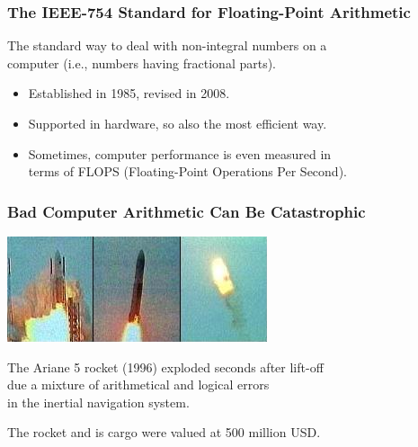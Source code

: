 \begin{frame}

\frametitle{The IEEE-754 Standard for Floating-Point Arithmetic}

\vspace{\fill}

\begin{center}

The standard way to deal with non-integral numbers on a \\ computer (i.e.,
numbers having fractional parts).

\end{center}

\vspace{\fill}

\begin{itemize}

\item Established in 1985, revised in 2008.

\item Supported in hardware, so also the most efficient way.

\item Sometimes, computer performance is even measured in \\ terms of FLOPS
(Floating-Point Operations Per Second).

\end{itemize}

\end{frame}


\begin{frame}

\frametitle{Bad Computer Arithmetic Can Be Catastrophic}

\begin{center}

\vspace{\fill}

\includegraphics[scale=0.5]{figures/explosion.jpg}

\vspace{\fill}

The Ariane 5 rocket (1996) exploded seconds after lift-off \\ due a mixture of
arithmetical and logical errors \\ in the inertial navigation system.

\vspace{\fill}

The rocket and is cargo were valued at 500 million USD.

\end{center}

\end{frame}


